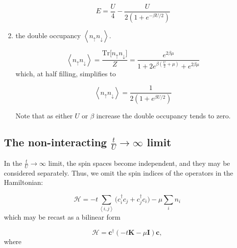 \begin{enumerate}
\begin{equation}
E = \frac{U}{4} - \frac{U}{2 ( 1 + e^{-\beta U /2} )}
\end{equation}

\item the double occupancy $\left\langle n_\uparrow n_\downarrow \right\rangle$.

\begin{equation}
\left\langle n_\uparrow n_\downarrow \right\rangle = \frac{\text{Tr} \big[ n_\uparrow n_\downarrow \big]}{Z} = \frac{e^{2\beta\mu}}{1 + 2 e^{\beta (\frac{U}{2} + \mu )} + e^{2\beta\mu}}
\end{equation}
which, at half filling, simplifies to

\begin{equation}
\left\langle n_\uparrow n_\downarrow \right\rangle = \frac{1}{2 ( 1 + e^{\beta U/2} )}
\end{equation}

Note that as either $U$ or $\beta$ increase the double occupancy tends to zero.
\end{enumerate}

\subsection{The non-interacting $\frac{t}{U} \rightarrow \infty$ limit}

In the $\frac{t}{U} \rightarrow \infty$ limit, the spin spaces become independent, and they may be considered separately. Thus, we omit the spin indices of the operators in the Hamiltonian:

\begin{equation}
\mathcal{H} = -t \sum_{\left\langle i, j \right\rangle} \big( c_i^\dagger c_j + c_j^\dagger c_i \big) - \mu \sum_i n_i
\end{equation}
which may be recast as a bilinear form

\begin{equation}
\mathcal{H} = \bm c^\dagger ( -t \bm K - \mu \bm I ) \bm c ,
\end{equation}
where


